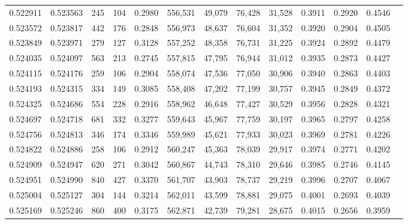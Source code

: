 \begin{tabular}{rrrrrrrrrrrrr}
0.522911 & 0.523563 &   245 &   104 &                                     0.2980 & 556,531 &  49,079 &  76,428 &  31,528 & 0.3911 & 0.2920 & 0.4546 \\
0.523572 & 0.523817 &   442 &   176 &                                     0.2848 & 556,973 &  48,637 &  76,604 &  31,352 & 0.3920 & 0.2904 & 0.4505 \\
0.523849 & 0.523971 &   279 &   127 &                                     0.3128 & 557,252 &  48,358 &  76,731 &  31,225 & 0.3924 & 0.2892 & 0.4479 \\
0.524035 & 0.524097 &   563 &   213 &                                     0.2745 & 557,815 &  47,795 &  76,944 &  31,012 & 0.3935 & 0.2873 & 0.4427 \\
0.524115 & 0.524176 &   259 &   106 &                                     0.2904 & 558,074 &  47,536 &  77,050 &  30,906 & 0.3940 & 0.2863 & 0.4403 \\
0.524193 & 0.524315 &   334 &   149 &                                     0.3085 & 558,408 &  47,202 &  77,199 &  30,757 & 0.3945 & 0.2849 & 0.4372 \\
0.524325 & 0.524686 &   554 &   228 &                                     0.2916 & 558,962 &  46,648 &  77,427 &  30,529 & 0.3956 & 0.2828 & 0.4321 \\
0.524697 & 0.524718 &   681 &   332 &                                     0.3277 & 559,643 &  45,967 &  77,759 &  30,197 & 0.3965 & 0.2797 & 0.4258 \\
0.524756 & 0.524813 &   346 &   174 &                                     0.3346 & 559,989 &  45,621 &  77,933 &  30,023 & 0.3969 & 0.2781 & 0.4226 \\
0.524822 & 0.524886 &   258 &   106 &                                     0.2912 & 560,247 &  45,363 &  78,039 &  29,917 & 0.3974 & 0.2771 & 0.4202 \\
0.524909 & 0.524947 &   620 &   271 &                                     0.3042 & 560,867 &  44,743 &  78,310 &  29,646 & 0.3985 & 0.2746 & 0.4145 \\
0.524951 & 0.524990 &   840 &   427 &                                     0.3370 & 561,707 &  43,903 &  78,737 &  29,219 & 0.3996 & 0.2707 & 0.4067 \\
0.525004 & 0.525127 &   304 &   144 &                                     0.3214 & 562,011 &  43,599 &  78,881 &  29,075 & 0.4001 & 0.2693 & 0.4039 \\
0.525169 & 0.525246 &   860 &   400 &                                     0.3175 & 562,871 &  42,739 &  79,281 &  28,675 & 0.4015 & 0.2656 & 0.3959 \\

\end{tabular}
